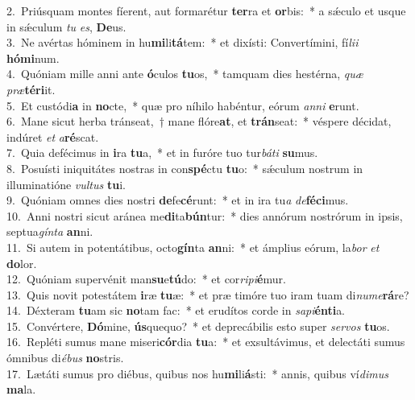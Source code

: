 {2.~}Priúsquam montes fíerent, aut formarétur \textbf{ter}ra et \textbf{or}bis:~* a sǽculo et usque in sǽculum \textit{tu} \textit{es}, \textbf{De}us.\\
{3.~}Ne avértas hóminem in hu\textbf{mi}li\textbf{tá}tem:~* et dixísti: Convertímini, fí\textit{li}\textit{i} \textbf{hó}\textbf{mi}num.\\
{4.~}Quóniam mille anni ante \textbf{ó}culos \textbf{tu}os,~* tamquam dies hestérna, \textit{quæ} \textit{præ}\textbf{té}\textbf{ri}it.\\
{5.~}Et custódi\textbf{a} in \textbf{no}cte,~* quæ pro níhilo habéntur, eórum \textit{an}\textit{ni} \textbf{e}runt.\\
{6.~}Mane sicut herba tránseat,~† mane flóre\textbf{at}, et \textbf{trán}seat:~* véspere décidat, indúret \textit{et} \textit{a}\textbf{ré}scat.\\
{7.~}Quia defécimus in \textbf{i}ra \textbf{tu}a,~* et in furóre tuo tur\textit{bá}\textit{ti} \textbf{su}mus.\\
{8.~}Posuísti iniquitátes nostras in con\textbf{spé}ctu \textbf{tu}o:~* sǽculum nostrum in illuminatióne \textit{vul}\textit{tus} \textbf{tu}i.\\
{9.~}Quóniam omnes dies nostri \textbf{de}fe\textbf{cé}runt:~* et in ira tu\textit{a} \textit{de}\textbf{fé}\textbf{ci}mus.\\
{10.~}Anni nostri sicut aránea me\textbf{di}ta\textbf{bún}tur:~* dies annórum nostrórum in ipsis, septua\textit{gín}\textit{ta} \textbf{an}ni.\\
{11.~}Si autem in potentátibus, octo\textbf{gín}ta \textbf{an}ni:~* et ámplius eórum, la\textit{bor} \textit{et} \textbf{do}lor.\\
{12.~}Quóniam supervénit man\textbf{su}e\textbf{tú}do:~* et cor\textit{ri}\textit{pi}\textbf{é}mur.\\
{13.~}Quis novit potestátem \textbf{i}ræ \textbf{tu}æ:~* et præ timóre tuo iram tuam di\textit{nu}\textit{me}\textbf{rá}re?\\
{14.~}Déxteram \textbf{tu}am sic \textbf{no}tam fac:~* et erudítos corde in \textit{sa}\textit{pi}\textbf{én}\textbf{ti}a.\\
{15.~}Convértere, \textbf{Dó}mine, \textbf{ús}quequo?~* et deprecábilis esto super \textit{ser}\textit{vos} \textbf{tu}os.\\
{16.~}Repléti sumus mane miseri\textbf{cór}dia \textbf{tu}a:~* et exsultávimus, et delectáti sumus ómnibus di\textit{é}\textit{bus} \textbf{no}stris.\\
{17.~}Lætáti sumus pro diébus, quibus nos hu\textbf{mi}li\textbf{á}sti:~* annis, quibus ví\textit{di}\textit{mus} \textbf{ma}la.\\
